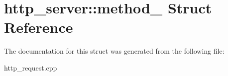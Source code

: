 \hypertarget{structhttp__server_1_1method__}{\section{http\-\_\-server\-:\-:method\-\_\- \-Struct \-Reference}
\label{structhttp__server_1_1method__}
}


\-The documentation for this struct was generated from the following file\-:\begin{DoxyCompactItemize}
\item 
http\-\_\-request.\-cpp\end{DoxyCompactItemize}
